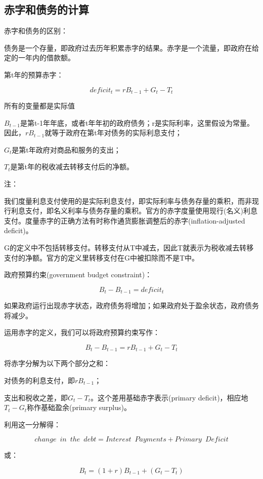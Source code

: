 \documentclass{article}
\begin{document}
\subsection{赤字和债务的计算}

赤字和债务的区别：

债务是一个存量，即政府过去历年积累赤字的结果。赤字是一个流量，即政府在给定的一年内的借款额。

\hspace*{\fill}

第t年的预算赤字：

\[
deficit_t=rB_{t-1}+G_t-T_t
\]

所有的变量都是实际值

$ B_{t-1} $是第t-1年年底，或者t年年初的政府债务；r是实际利率，这里假设为常量。因此，$ rB_{t-1} $就等于政府在第t年对债务的实际利息支付；

$ G_t $是第t年政府对商品和服务的支出；

$ T_t $是第t年的税收减去转移支付后的净额。

注：

我们度量利息支付使用的是实际利息支付，即实际利率与债务存量的乘积，而非现行利息支付，即名义利率与债务存量的乘积。官方的赤字度量使用现行(名义)利息支付。度量赤字的正确方法有时称作通货膨胀调整后的赤字(inflation-adjusted deficit)。

G的定义中不包括转移支付。转移支付从T中减去，因此T就表示为税收减去转移支付的净额。官方的定义里转移支付在G中被扣除而不是T中。

政府预算约束(government budget constraint)：

\[
B_t-B_{t-1}=deficit_t
\]

如果政府运行出现赤字状态，政府债务将增加；如果政府处于盈余状态，政府债务将减少。

运用赤字的定义，我们可以将政府预算约束写作：

\[
B_t-B_{t-1}=rB_{t-1}+G_t-T_t
\]

将赤字分解为以下两个部分之和：

对债务的利息支付，即$ rB_{t-1} $；

支出和税收之差，即$ G_t-T_t $。这个差用基础赤字表示(primary deficit)，相应地$ T_t-G_t $称作基础盈余(primary surplus)。

利用这一分解得：

\[
change\enspace in\enspace the\enspace debt=Interest\enspace Payments+Primary\enspace Deficit
\]

或：

\[
B_t=(1+r)B_{t-1}+(G_t-T_t)
\]
\end{document}
